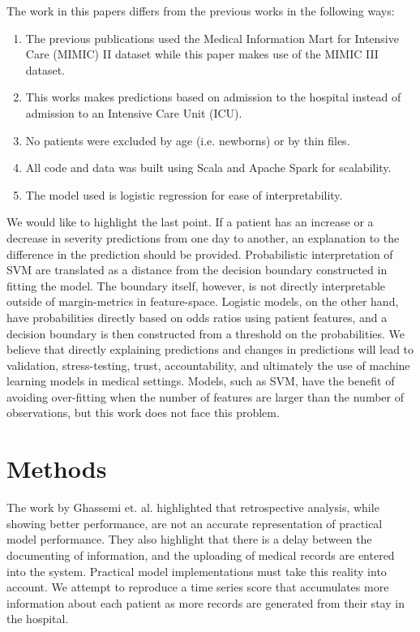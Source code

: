 \documentclass[journal]{IEEEtran}
\begin{document}
The work in this papers differs from the previous works in the following ways:

\begin{enumerate}
\item The previous publications used the Medical Information Mart for Intensive Care (MIMIC) II dataset while this paper makes use of the MIMIC III dataset.~\cite{saeed_multiparameter_2011}
\item This works makes predictions based on admission to the hospital instead of admission to an Intensive Care Unit (ICU).
\item No patients were excluded by age (i.e. newborns) or by thin files.
\item All code and data was built using Scala and Apache Spark for scalability.
\item The model used is logistic regression for ease of interpretability.

\end{enumerate}

We would like to highlight the last point.   If a patient has an increase or a decrease in severity predictions from one day to another, an explanation to the difference in the prediction should be provided.  Probabilistic interpretation of SVM are translated as a distance from the decision boundary constructed in fitting the model.  The boundary itself, however, is not directly interpretable outside of margin-metrics in feature-space.  Logistic models, on the other hand, have probabilities directly based on odds ratios using patient features, and a decision boundary is then constructed from a threshold on the probabilities.  We believe that directly explaining predictions and changes in predictions will lead to validation, stress-testing, trust, accountability, and ultimately the use of machine learning models in medical settings.  Models, such as SVM, have the benefit of avoiding over-fitting when the number of features are larger than the number of observations, but this work does not face this problem.


\section{Methods}

The work by Ghassemi et. al. highlighted that retrospective analysis, while showing better performance, are not an accurate representation of practical model performance.  They also highlight that there is a delay between the documenting of information, and the uploading of medical records are entered into the system.  Practical model implementations must take this reality into account.  We attempt to reproduce a time series score that accumulates more information about each patient as more records are generated from their stay in the hospital.
\end{document}
